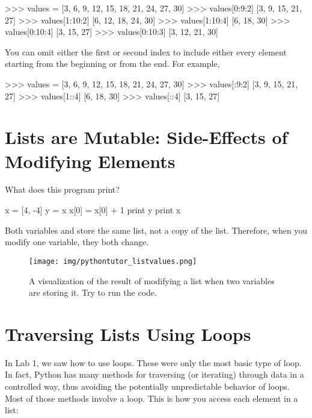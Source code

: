 \documentclass[11pt]{cselabheader}
\begin{document}
\begin{pyconcode}
>>> values = [3, 6, 9, 12, 15, 18, 21, 24, 27, 30]
>>> values[0:9:2]
[3, 9, 15, 21, 27]
>>> values[1:10:2]
[6, 12, 18, 24, 30]
>>> values[1:10:4]
[6, 18, 30]
>>> values[0:10:4]
[3, 15, 27]
>>> values[0:10:3]
[3, 12, 21, 30]

\end{pyconcode}

You can omit either the first or second index to include either every
element starting from the beginning or from the end.  For example,

\begin{pyconcode}
>>> values = [3, 6, 9, 12, 15, 18, 21, 24, 27, 30]
>>> values[:9:2]
[3, 9, 15, 21, 27]
>>> values[1::4]
[6, 18, 30]
>>> values[::4]
[3, 15, 27]

\end{pyconcode}


\section{Lists are Mutable: Side-Effects of Modifying Elements}

What does this program print?

\begin{python3code}
x = [4, -4]
y = x
x[0] = x[0] + 1
print y
print x
\end{python3code}

Both variables  and  store the same
list, not a copy of the list. Therefore, when you modify one variable,
they both change.

\begin{figure}[H]
  \begin{center}
  \texttt{[image: img/pythontutor\_listvalues.png]}
  \end{center}
  \caption{A visualization of the result of modifying a list when two variables are
  storing it. Try to run the code.}
\end{figure}

\section{\texorpdfstring%
  {Traversing Lists Using  Loops}
  {Traversing Lists Using For Loops}}

In Lab 1, we saw how to use  loops.
These were only the most basic type of 
loop. In fact, Python has many methods for traversing (or iterating)
through data in a controlled way, thus avoiding the potentially
unpredictable behavior of  loops. Most of
those methods involve a  loop.
This is how you access each element in a list:
\end{document}
